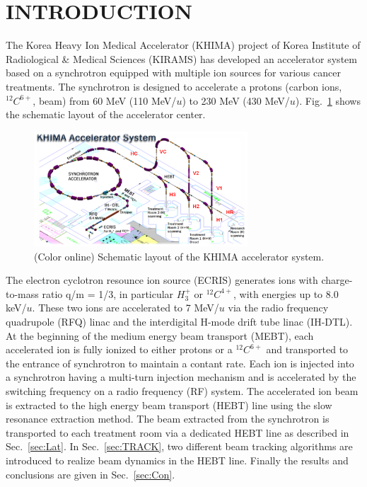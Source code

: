 \documentclass[jkps,preprint,fleqn,showpacs,showkeys,10pt,twocolumn]{revtex4}
\begin{document}

\section{INTRODUCTION}
The Korea Heavy Ion Medical Accelerator (KHIMA) project of Korea Institute of Radiological \& Medical Sciences (KIRAMS) 
has developed an accelerator system based on a synchrotron equipped with multiple ion sources for various cancer treatments.
The synchrotron is designed to accelerate a protons (carbon ions, $^{12}C^{6+}$, beam) 
from 60 MeV (110 MeV/$u$) to 230 MeV (430 MeV/$u$). %
Fig.~\ref{fig0} shows the schematic layout of the accelerator center. 
\begin{figure}[h]
  \begin{center}
    \includegraphics[width=8.0cm]{Fig01.png}
    \caption{(Color online) Schematic layout of the KHIMA accelerator system.}
    \label{fig0}
  \end{center}
\end{figure}
The electron cyclotron resounce ion source (ECRIS) generates ions with charge-to-mass ratio q/m = 1/3, in particular $H^{+}_{3}$ or $^{12}C^{4+}$, 
with energies up to 8.0 keV/$u$. 
These two ions are accelerated to 7 MeV/$u$ via the radio frequency quadrupole (RFQ) linac and the interdigital H-mode drift tube linac (IH-DTL). 
At the beginning of the medium energy beam transport (MEBT), each accelerated ion is fully ionized to either protons or a $^{12}C^{6+}$ 
and transported to the entrance of synchrotron to maintain a contant rate. 
Each ion is injected into a synchrotron having a multi-turn injection mechanism and is accelerated by the switching frequency on a radio frequency (RF) system. 
The accelerated ion beam is extracted to the high energy beam transport (HEBT) line using the slow resonance extraction method\cite{Extract,HJYim,Chawon}.
The beam extracted from the synchrotron is transported to each treatment room via a dedicated HEBT line as described in Sec.~\ref{sec:Lat}.
In Sec.~\ref{sec:TRACK}, two different beam tracking algorithms are introduced to realize beam dynamics in the HEBT line.
Finally the results and conclusions are given in Sec.~\ref{sec:Con}.
\end{document}
